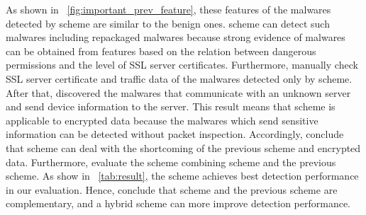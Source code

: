 As shown in \figurename~\ref{fig:important_prev_feature}, these features of the malwares detected by \our scheme are similar to the benign ones.
\Our scheme can detect such malwares including repackaged malwares because strong evidence of malwares can be obtained from \our features based on the relation between dangerous permissions and the level of SSL server certificates. 
Furthermore, \we manually check SSL server certificate and traffic data of the malwares detected only by \our scheme.
After that, \we discovered the malwares that communicate with an unknown server and send device information to the server.
This result means that \our scheme is applicable to encrypted data because the malwares which send sensitive information can be detected without packet inspection.
Accordingly, \we conclude that \our scheme can deal with the shortcoming of the previous scheme and encrypted data.
Furthermore, \we evaluate the scheme combining \our scheme and the previous scheme.
As show in \tablename~\ref{tab:result}, the scheme achieves best detection performance in our evaluation.
Hence, \we conclude that \our scheme and the previous scheme are complementary, and a hybrid scheme can more improve detection performance.
\afterpage{\clearpage}
\newpage
